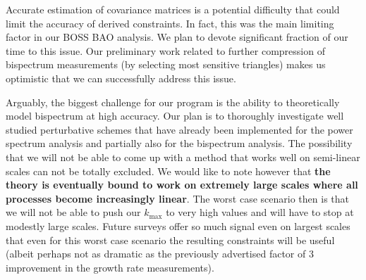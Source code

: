 
Accurate estimation of covariance matrices is a potential difficulty that
could limit the accuracy of derived constraints. In fact, this was the main
limiting factor in our BOSS BAO analysis. We plan to devote significant
fraction of our time to this issue. Our preliminary work related to further
compression of bispectrum measurements (by selecting most sensitive triangles)
makes us optimistic that we can successfully address this issue.

Arguably, the biggest challenge for our program is the ability to theoretically
model bispectrum at high accuracy. Our plan is to thoroughly investigate well
studied perturbative schemes that have already been implemented for the
power spectrum analysis and partially also for the bispectrum analysis. The
possibility that we will not be able to come up with a method that works well
on semi-linear scales can not be totally excluded. We would like to note
however that \textbf{the theory is eventually bound to work on extremely large scales
where all processes become increasingly linear}. The worst case scenario then is
that we will not be able to push our $k_\mathrm{max}$ to very high values and
will have to stop at modestly large scales. Future surveys offer so much
signal even on largest scales that even for this worst case scenario the
resulting constraints will be useful (albeit perhaps not as dramatic as the
previously advertised factor of 3 improvement in the growth rate measurements).

